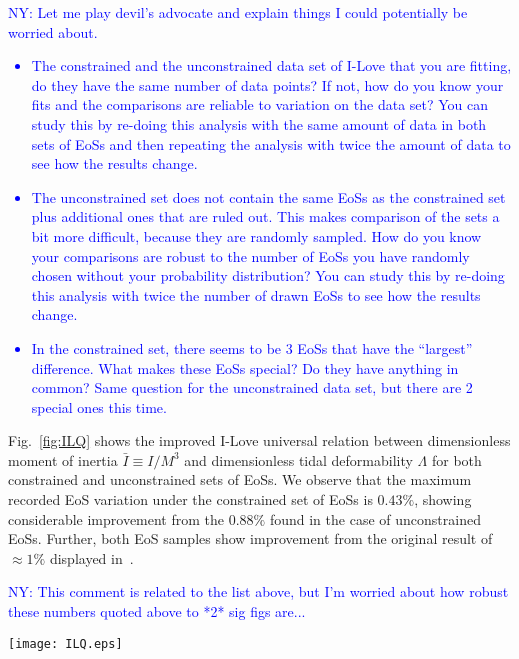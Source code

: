 \documentclass[prd,twocolumn,nofootinbib,superscriptaddress,amsmath,amssymb]{revtex4-1}
\newcommand{\ny}[1]{\textcolor{blue}{NY: #1} }
\begin{document}
{\ny{Let me play devil's advocate and explain things I could potentially be worried about.
\begin{itemize}
\item The constrained and the unconstrained data set of I-Love that you are fitting, do they have the same number of data points? If not, how do you know your fits and the comparisons are reliable to variation on the data set? You can study this by re-doing this analysis with the same amount of data in both sets of EoSs and then repeating the analysis with twice the amount of data to see how the results change.  
\item  The unconstrained set does not contain the same EoSs as the constrained set plus additional ones that are ruled out. This makes comparison of the sets a bit more difficult, because they are randomly sampled. How do you know your comparisons are robust to the number of EoSs you have randomly chosen without your probability distribution? You can study this by re-doing this analysis with twice the number of drawn EoSs to see how the results change. 
\item In the constrained set, there seems to be 3 EoSs that have the ``largest'' difference. What makes these EoSs special? Do they have anything in common?  Same question for the unconstrained data set, but there are 2 special ones this time. 
\end{itemize}
}}
Fig.~\ref{fig:ILQ} shows the improved I-Love universal relation between dimensionless moment of inertia $\bar{I} \equiv I/M^3$ and dimensionless tidal deformability $\Lambda$ for both constrained and unconstrained sets of EoSs.
We observe that the maximum recorded EoS variation under the constrained set of EoSs is $0.43\%$, showing considerable improvement from the $0.88\%$ found in the case of unconstrained EoSs.
Further, both EoS samples show improvement from the original result of $\approx 1\%$ displayed in~\cite{Yagi:ILQ}.

{\ny{This comment is related to the list above, but I'm worried about how robust these numbers quoted above to *2* sig figs are...}}

\begin{figure*}
\begin{center} 
\texttt{[image: ILQ.eps]}
\end{center}
\caption{
I-Love universal relations shown for the constrained EoSs (left) and unconstrained EoSs (right).
In these figures, the black dashed lines corresponds to the fit given by Eq.~\ref{eq:ILQfit}, while all other colors correspond to the 35 EoSs used in each case.
The maximal EoS variation from the fit for unconstrained EoSs is $0.88\%$, which is comparable to the $1\%$ found in~\cite{Yagi:ILQ}.
The constrained EoSs on the other hand, are universal to $0.43\%$, showing considerable improvement upon previous analyses.
}
\label{fig:ILQ}
\end{figure*} 
\end{document}
